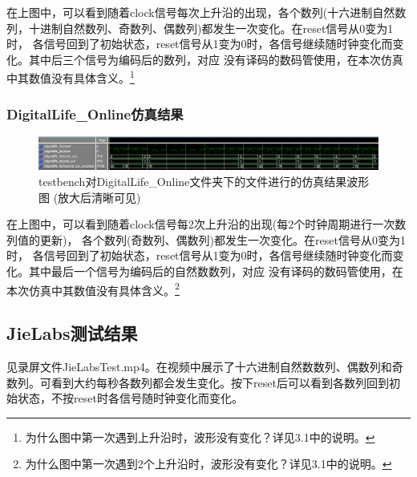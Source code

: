 \documentclass[UTF8]{article}
\begin{document}
\qquad 在上图中，可以看到随着clock信号每次上升沿的出现，各个数列(十六进制自然数列，十进制自然数列、奇数列、偶数列)都发生一次变化。在reset信号从0变为1时，
各信号回到了初始状态，reset信号从1变为0时，各信号继续随时钟变化而变化。其中后三个信号为编码后的数列，对应
没有译码的数码管使用，在本次仿真中其数值没有具体含义。\footnote{为什么图中第一次遇到上升沿时，波形没有变化？详见3.1中的说明。}


\subsubsection{DigitalLife\_Online仿真结果}
\begin{figure}[h]
    \centering
    \includegraphics[width=\textwidth]{DL_Online_testbench.png}
    \caption{testbench对DigitalLife\_Online文件夹下的文件进行的仿真结果波形图 (放大后清晰可见)}
\end{figure}

\qquad 在上图中，可以看到随着clock信号每2次上升沿的出现(每2个时钟周期进行一次数列值的更新)，
各个数列(奇数列、偶数列)都发生一次变化。在reset信号从0变为1时，
各信号回到了初始状态，reset信号从1变为0时，各信号继续随时钟变化而变化。其中最后一个信号为编码后的自然数数列，对应
没有译码的数码管使用，在本次仿真中其数值没有具体含义。\footnote{为什么图中第一次遇到2个上升沿时，波形没有变化？详见3.1中的说明。}


\subsection{JieLabs测试结果}
\qquad 见录屏文件JieLabsTest.mp4。在视频中展示了十六进制自然数数列、偶数列和奇数列。可看到大约每秒各数列都会发生变化。按下reset后可以看到各数列回到初始状态，不按reset时各信号随时钟变化而变化。



\end{document}
